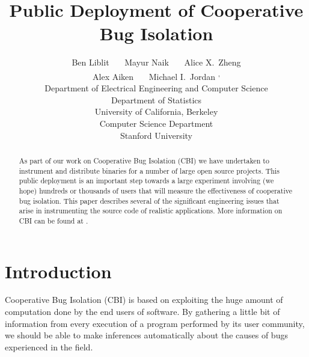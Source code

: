 \documentclass[times,10pt,twocolumn]{article}
\begin{document}
\title{Public Deployment of Cooperative Bug Isolation}

\makeatletter
\newcommand*{\eecsMark}[0]{\@fnsymbol{2}}
\newcommand*{\statMark}[0]{\@fnsymbol{3}}
\newcommand*{\stanMark}[0]{\@fnsymbol{4}}
\makeatother
\newcommand*{\eecs}[0]{\textsuperscript{\eecsMark}}
\newcommand*{\stat}[0]{\textsuperscript{\statMark}}
\newcommand*{\both}[0]{\textsuperscript{\eecsMark, \statMark}}
\newcommand*{\stan}[0]{\textsuperscript{\stanMark}}

\author{
  Ben Liblit \eecs \ \ \ Mayur Naik \stan \ \ \  Alice X.\ Zheng \eecs \\
  Alex Aiken \stan \ \ \ Michael I.\ Jordan \both  \\
 \eecs Department of Electrical Engineering and Computer Science \\ 
  \stat Department of Statistics \\
 University of California, Berkeley \\
 \stan Computer Science Department \\
 Stanford University
}

\maketitle

\begin{abstract}
As part of our work on Cooperative Bug Isolation (CBI) we have undertaken to 
instrument and distribute binaries for a number of large open source projects.
This
public deployment is an important  step towards a large experiment involving (we hope) hundreds or thousands of users that will measure the effectiveness of cooperative bug isolation.
This paper describes several of the significant engineering issues that arise in 
instrumenting the source code of realistic applications.  
More information on CBI can be found at \cite{Liblit:CBIP}.
\end{abstract}

\section{Introduction}

Cooperative Bug Isolation (CBI) is based on exploiting the
huge amount of computation done by the end users of software.  By
gathering a little bit of information from every execution of a
program performed by its user community, we should be able to make
inferences automatically about the causes of bugs experienced in the field.
\end{document}
